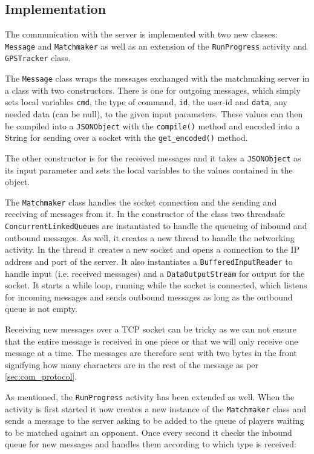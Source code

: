 \subsection{Implementation}
The communication with the server is implemented with two new classes: \texttt{Message} and \texttt{Matchmaker} as well as an extension of the \texttt{RunProgress} activity and \texttt{GPSTracker} class. 

The \texttt{Message} class wraps the messages exchanged with the matchmaking server in a class with two constructors. There is one for outgoing messages, which simply sets local variables \texttt{cmd}, the type of command, \texttt{id}, the user-id and \texttt{data}, any needed data (can be null), to the given input parameters. These values can then be compiled into a \texttt{JSONObject} with the \texttt{compile()} method and encoded into a String for sending over a socket with the \texttt{get\_encoded()} method. 

The other constructor is for the received messages and it takes a \texttt{JSON\-Object} as its input parameter and sets the local variables to the values contained in the object.

The \texttt{Matchmaker} class handles the socket connection and the sending and receiving of messages from it. In the constructor of the class two threadsafe \texttt{Concurrent\-Linked\-Queue}s are instantiated to handle the queueing of inbound and outbound messages. As well, it creates a new thread to handle the networking activity. In the thread it creates a new socket and opens a connection to the \ac{IP} address and port of the server. It also instantiates a \texttt{Buffered\-Input\-Reader} to handle input (i.e. received messages) and a \texttt{Data\-Output\-Stream} for output for the socket. It starts a while loop, running while the socket is connected, which listens for incoming messages and sends outbound messages as long as the outbound queue is not empty.

Receiving new messages over a \ac{TCP} socket can be tricky as we can not ensure that the entire message is received in one piece or that we will only receive one message at a time. The messages are therefore sent with two bytes in the front signifying how many characters are in the rest of the message as per \autoref{sec:com_protocol}.

As mentioned, the \texttt{RunProgress} activity has been extended as well. When the activity is first started it now creates a new instance of the \texttt{Matchmaker} class and sends a message to the server asking to be added to the queue of players waiting to be matched against an opponent. Once every second it checks the inbound queue for new messages and handles them according to which type is received:

